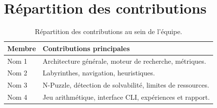 \section{Répartition des contributions}

\begin{table}[H]
\centering
\caption{Répartition des contributions au sein de l'équipe.}
\begin{tabularx}{\textwidth}{p{3.5cm}Y}
\toprule
\textbf{Membre} & \textbf{Contributions principales} \\
\midrule
Nom 1 & Architecture générale, moteur de recherche, métriques. \\
Nom 2 & Labyrinthes, navigation, heuristiques. \\
Nom 3 & N-Puzzle, détection de solvabilité, limites de ressources. \\
Nom 4 & Jeu arithmétique, interface CLI, expériences et rapport. \\
\bottomrule
\end{tabularx}
\end{table}